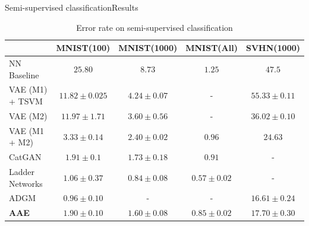 \documentclass[10pt]{beamer}
\begin{document}
\begin{frame}{Semi-supervised classification}{Results}
\begin{table}
  \centering
  \scriptsize
    \begin{tabular}{l||c|c|c||c}
    	\toprule
    	                &     MNIST(100)      &    MNIST(1000)    &    MNIST(All)     &     SVHN(1000)     \\ \midrule
    	NN Baseline     &      $ 25.80 $      &     $ 8.73 $      &     $ 1.25 $      &      $ 47.5 $      \\ \midrule
    	VAE (M1) + TSVM & $ 11.82 \pm 0.025 $ & $ 4.24 \pm 0.07 $ &         -         & $ 55.33 \pm 0.11 $ \\
    	VAE (M2)        & $ 11.97 \pm 1.71 $  & $ 3.60 \pm 0.56 $ &         -         & $ 36.02 \pm 0.10 $ \\
    	VAE (M1 + M2)   &  $ 3.33 \pm 0.14 $  & $ 2.40 \pm 0.02 $ &     $ 0.96 $      &     $ 24.63 $      \\
    	CatGAN          &  $ 1.91 \pm 0.1 $   & $ 1.73 \pm 0.18 $ &     $ 0.91 $      &         -          \\
    	Ladder Networks &  $ 1.06 \pm 0.37 $  & $ 0.84 \pm 0.08 $ & $ 0.57 \pm 0.02 $ &         -          \\
    	ADGM            &  $ 0.96 \pm 0.10 $  &         -         &         -         & $ 16.61 \pm 0.24 $ \\ \midrule
    	\textbf{AAE}    &  $ 1.90 \pm 0.10 $  & $ 1.60 \pm 0.08 $ & $ 0.85 \pm 0.02 $ & $ 17.70 \pm 0.30 $ \\ \bottomrule
    \end{tabular}
  \caption{Error rate on semi-supervised classification}
\end{table}
\end{frame}
\end{document}
